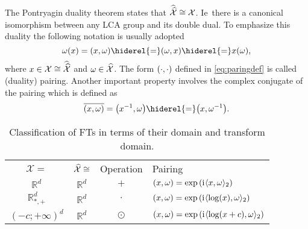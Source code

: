 \paragraph{}
The Pontryagin duality theorem states that $\widehat{\widehat{\mathcal{X}}}\cong
\mathcal{X}$. \acs{Ie}~there is a canonical isomorphism between any \ac{LCA}
group and its double dual. To emphasize this duality the following notation is
usually adopted
\begin{dmath}
    \label{eq:paringdef} \omega(x) = \pairing{x, \omega} \hiderel{=}
    \pairing{\omega, x} \hiderel{=} x(\omega),
\end{dmath}
where $x\in\mathcal{X}\cong\widehat{\widehat{\mathcal{X}}}$ and
$\omega\in\widehat{\mathcal{X}}$. The form $(\cdot,\cdot)$ defined in
\cref{eq:paringdef} is called (duality) pairing. Another important property
involves the complex conjugate of the pairing which is defined as
\begin{dmath}
    \conj{\pairing{x, \omega}} = \pairing*{\inv{x}, \omega} \hiderel{=}
    \pairing*{x, \inv{\omega}}.
\end{dmath}
\begin{table}[htb]
    \caption{Classification of \acl{FT}s in terms of their domain and transform
    domain.}
    \label{tab:dual_and_pairing}
    \centering
    \begin{tabularx}{\textwidth}{cccX}
        \toprule
            \multicolumn{1}{c}{$\mathcal{X}=$} &
            \multicolumn{1}{c}{$\widehat{\mathcal{X}}\cong$} &
            \multicolumn{1}{c}{Operation} & \multicolumn{1}{l}{Pairing} \\
        \cmidrule{1-4}
            $\mathbb{R}^d$ & $\mathbb{R}^d$ & $+$ & $(x,\omega) =
            \exp\left({\mathrm{i}\mkern1mu} \langle x, \omega\rangle_2\right)$ \\ $\mathbb{R}^d_{*,+}$ &
            $\mathbb{R}^d$ & $\cdot$ & $(x,\omega) =\exp\left( {\mathrm{i}\mkern1mu}
            \langle\log(x), \omega\rangle_2 \right)$ \\ $(-c;+\infty)^d$ &
            $\mathbb{R}^d$ & $\odot$ & $(x,\omega) =\exp\left( {\mathrm{i}\mkern1mu}
            \langle\log(x+c), \omega\rangle_2 \right)$ \\
        \bottomrule
    \end{tabularx}
\end{table}
